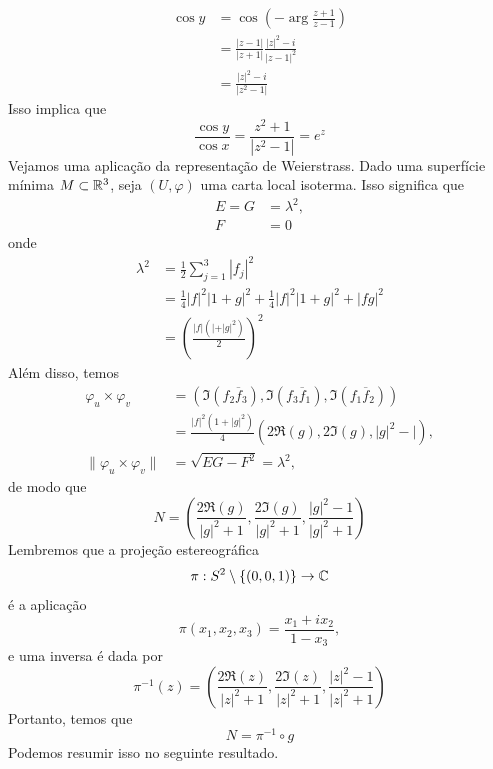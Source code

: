 \begin{exemplo}
\begin{align*}
	\cos y &= \cos \left( -\arg \frac{z + 1}{z - 1} \right) \\
	&= \frac{|z - 1|}{|z + 1|} \frac{|z|^2 - i}{|z - 1|^2} \\
	&= \frac{|z|^2 - i}{|z^2 - 1|}
	\end{align*}
	Isso implica que
	\begin{equation*}
	\frac{\cos y}{\cos x} = \frac{z^2 + 1}{|z^2 - 1|} = e^z
	\end{equation*}
	Vejamos uma aplicação da representação de Weierstrass. Dado uma superfície mínima $M \subset \mathbb{R}^3$, seja $(U, \varphi)$ uma carta local isoterma.
	Isso significa que
	\begin{align*}
	E = G &= \lambda^2, \\
	F &= 0
	\end{align*}
	onde
	\begin{align*}
	\lambda^2 &= \frac{1}{2} \sum_{j=1}^{3} |f_j|^2 \\
	&= \frac{1}{4} |f|^2 |1 + g|^2 + \frac{1}{4} |f|^2 |1 + g|^2 + |fg|^2\\
	&= \left( \frac{|f| (| + |g|^2)}{2} \right)^2
	\end{align*} 
	Além disso, temos
	\begin{align*}
	\varphi_u \times \varphi_v &= \left( \Im (f_2 \overline{f}_3), \Im (f_3 \overline{f}_1), \Im (f_1 \overline{f}_2) \right) \\
	&= \frac{|f|^2 (1 + |g|^2)}{4} \left( 2 \Re(g), 2 \Im(g), |g|^2 - | \right), \\
	\| \varphi_u \times \varphi_v \| &= \sqrt{EG - F^2} = \lambda^2,
	\end{align*}
	de modo que
	\begin{equation*}
	N = \left( \frac{2 \Re(g)}{|g|^2 + 1}, \frac{2 \Im(g)}{|g|^2 + 1}, \frac{|g|^2 - 1}{|g|^2 + 1} \right)
	\end{equation*}
	Lembremos que a projeção estereográfica
	\begin{equation*}
	\pi: S^2 \setminus \{ (0,0,1) \} \rightarrow \mathbb{C}
	\end{equation*}
	é a aplicação
	\begin{equation*}
	\pi(x_1, x_2, x_3) = \frac{x_1 + ix_2}{1 - x_3},
	\end{equation*}
	e uma inversa é dada por
	\begin{equation*}
	\pi^{-1}(z) = \left( \frac{2 \Re(z)}{|z|^2 + 1}, \frac{2 \Im(z)}{|z|^2 + 1}, \frac{|z|^2 - 1}{|z|^2 + 1} \right)
	\end{equation*}
	Portanto, temos que
	\begin{equation*}
	N = \pi^{-1} \circ g
	\end{equation*}
	Podemos resumir isso no seguinte resultado.
\end{exemplo}


